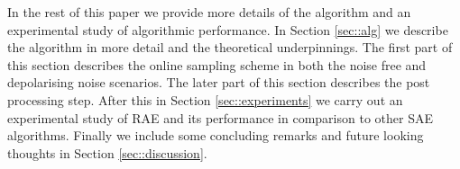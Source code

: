 In the rest of this paper we provide more details of the algorithm and an experimental study of algorithmic performance. In Section \ref{sec::alg} we describe the algorithm in more detail and the theoretical underpinnings. The first part of this section describes the online sampling scheme in both the noise free and depolarising noise scenarios. The later part of this section describes the post processing step. After this in Section \ref{sec::experiments} we carry out an experimental study of RAE and its performance in comparison to other SAE algorithms. Finally we include some concluding remarks and future looking thoughts in Section \ref{sec::discussion}.

\newpage

